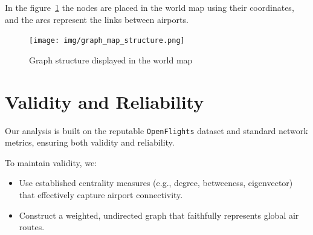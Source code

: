 \documentclass[12pt]{article}
\begin{document}
    In the figure~\ref{fig:world-graph} the nodes are placed in the world map using their coordinates, and the arcs represent the links between airports.

    \begin{figure}[H]
        \centering
        \texttt{[image: img/graph\_map\_structure.png]}
        \caption{Graph structure displayed in the world map}
        \label{fig:world-graph}
    \end{figure}

    \section{Validity and Reliability}\label{sec:validity-and-reliability}
    Our analysis is built on the reputable \texttt{OpenFlights} dataset and standard network metrics, ensuring both validity and reliability.

    To maintain validity, we:
    \begin{itemize}
        \item Use established centrality measures (e.g., degree, betweeness, eigenvector) that effectively capture airport connectivity.
        \item Construct a weighted, undirected graph that faithfully represents global air routes.
    \end{itemize}
\end{document}

